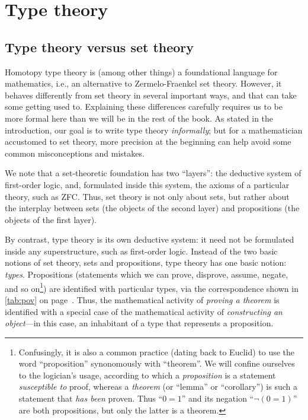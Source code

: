 \chapter{Type theory}
\label{cha:typetheory}

\section{Type theory versus set theory}
\label{sec:types-vs-sets}
\label{sec:axioms}

Homotopy type theory is (among other things) a foundational language for mathematics, i.e., an alternative to Zermelo-Fraenkel set theory.
However, it behaves differently from set theory in several important ways, and that can take some getting used to.
Explaining these differences carefully requires us to be more formal here than we will be in the rest of the book.
As stated in the introduction, our goal is to write type theory \emph{informally}; but for a mathematician accustomed to set theory, more precision at the beginning can help avoid some common misconceptions and mistakes.

We note that a set-theoretic foundation has two ``layers'': the deductive system of first-order logic, and, formulated inside this system, the axioms of a particular theory, such as ZFC.
Thus, set theory is not only about sets, but rather about the interplay between sets (the objects of the second layer) and propositions (the objects of the first layer).

By contrast, type theory is its own deductive system: it need not be formulated inside any superstructure, such as first-order logic.
Instead of the two basic notions of set theory, sets and propositions, type theory has one basic notion: \emph{types}.
Propositions (statements which we can prove, disprove, assume, negate, and so on\footnote{Confusingly, it is also a common practice (dating back to Euclid) to use the word ``proposition'' synonomously with ``theorem''.
  We will confine ourselves to the logician's usage, according to which a \emph{proposition} is a statement \emph{susceptible to} proof, whereas a \emph{theorem} (or ``lemma'' or ``corollary'') is such a statement that \emph{has been} proven.
Thus ``$0=1$'' and its negation ``$\neg(0=1)$'' are both propositions, but only the latter is a theorem.}) are identified with particular types, via the correspondence shown in \autoref{tab:pov} on page~\pageref{tab:pov}.
Thus, the mathematical activity of \emph{proving a theorem} is identified with a special case of the mathematical activity of \emph{constructing an object}---in this case, an inhabitant of a type that represents a proposition.


